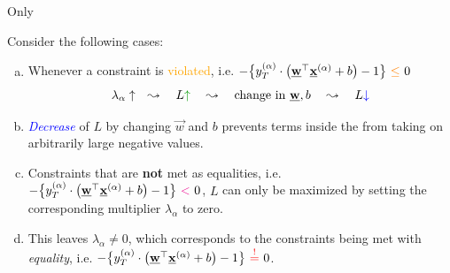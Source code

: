 \begin{frame}{Only}
{
Consider the following cases:

\begin{enumerate}[(a)]
	\item<only@2> Whenever a constraint is \textcolor{orange}{violated}, i.e.
	\begingroup 
	\footnotesize
	$
	-\big\{ y_{T}^{(\alpha)} \cdot \big( \vec w^{\top} \vec x^{(\alpha)} + b \big) -1 \big\}~{\color{orange}\le}~0
	$
	\endgroup 
	\begin{equation}
	\lambda_\alpha \uparrow \quad \leadsto\quad L {\color{darkgreen}\uparrow} \quad \leadsto\quad \text{change in } \vec w,b \quad \leadsto\quad L {\color{blue}\downarrow}
	\end{equation}
	
	\item<only@3> \emph{\textcolor{blue}{Decrease}} of $L$ by changing $\vec w$ and $b$ prevents terms inside the   from taking on arbitrarily large negative values.
	
	\item<only@4> Constraints that are \textbf{not} met as equalities, i.e.
	\begingroup 
	\footnotesize
	$
	-\big\{ y_{T}^{(\alpha)} \cdot \big( \vec w^{\top} \vec x^{(\alpha)} + b \big) -1 \big\}~{\color{magenta}{<}}~0
	$\endgroup, $L$ can only be maximized by setting the corresponding multiplier $\lambda_\alpha$ to zero.
	
	\item<only@5,6>  This leaves $\lambda_\alpha \ne 0$, which corresponds to the constraints being met with \emph{equality}, i.e. 
	\begingroup 
	\footnotesize
	$
	-\big\{ y_{T}^{(\alpha)} \cdot \big( \vec w^{\top} \vec x^{(\alpha)} + b \big) -1 \big\}~{\color{red}{\eqexcl}}~0
	$\endgroup. 

	\\


\end{enumerate}}
\end{frame}
